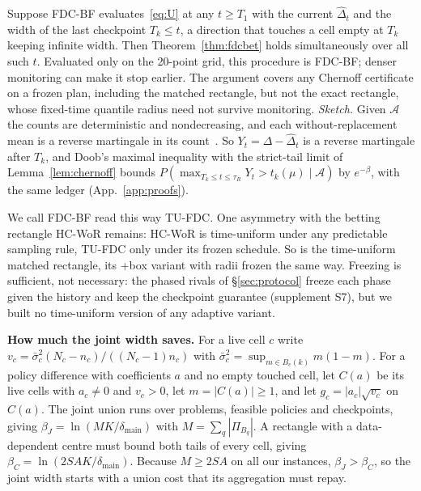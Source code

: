 \documentclass[sigconf,anonymous,review]{acmart}
\newcommand{\cA}{\mathcal{A}}
\newcommand{\dmain}{\delta_{\text{main}}}
\begin{document}
\begin{remark}\label{rem:tu}
Suppose FDC-BF evaluates~\eqref{eq:U} at any $t \ge T_1$ with the current $\hat\Delta_t$ and the width of the last checkpoint $T_k \le t$, a direction that touches a cell empty at $T_k$ keeping infinite width. Then Theorem~\ref{thm:fdcbet} holds simultaneously over all such $t$. Evaluated only on the 20-point grid, this procedure is FDC-BF; denser monitoring can make it stop earlier. The argument covers any Chernoff certificate on a frozen plan, including the matched rectangle, but not the exact rectangle, whose fixed-time quantile radius need not survive monitoring. \emph{Sketch.} Given $\cA$ the counts are deterministic and nondecreasing, and each without-replacement mean is a reverse martingale in its count~\citep{serfling1974probability,bardenet2015concentration}. So $Y_t = \Delta - \hat\Delta_t$ is a reverse martingale after $T_k$, and Doob's maximal inequality with the strict-tail limit of Lemma~\ref{lem:chernoff} bounds $P(\max_{T_k \le t \le \tau_R} Y_t > t_k(\mu) \mid \cA)$ by $e^{-\beta}$, with the same ledger (App.~\ref{app:proofs}).
\end{remark}

We call FDC-BF read this way TU-FDC. One asymmetry with the betting rectangle HC-WoR remains: HC-WoR is time-uniform under any predictable sampling rule, TU-FDC only under its frozen schedule. So is the time-uniform matched rectangle, its +box variant with radii frozen the same way. Freezing is sufficient, not necessary: the phased rivals of \S\ref{sec:protocol} freeze each phase given the history and keep the checkpoint guarantee (supplement S7), but we built no time-uniform version of any adaptive variant.

\textbf{How much the joint width saves.} For a live cell $c$ write $v_c = \bar\sigma_c^2 (N_c - n_c)/((N_c - 1)n_c)$ with $\bar\sigma_c^2 = \sup_{m \in B_c(k)} m(1-m)$. For a policy difference with coefficients $a$ and no empty touched cell, let $C(a)$ be its live cells with $a_c \ne 0$ and $v_c > 0$, let $m = |C(a)| \ge 1$, and let $g_c = |a_c|\sqrt{v_c}$ on $C(a)$. The joint union runs over problems, feasible policies and checkpoints, giving $\beta_J = \ln(MK/\dmain)$ with $M = \sum_q |\Pi_{B_q}|$. A rectangle with a data-dependent centre must bound both tails of every cell, giving $\beta_C = \ln(2SAK/\dmain)$. Because $M \ge 2SA$ on all our instances, $\beta_J > \beta_C$, so the joint width starts with a union cost that its aggregation must repay.
\end{document}
